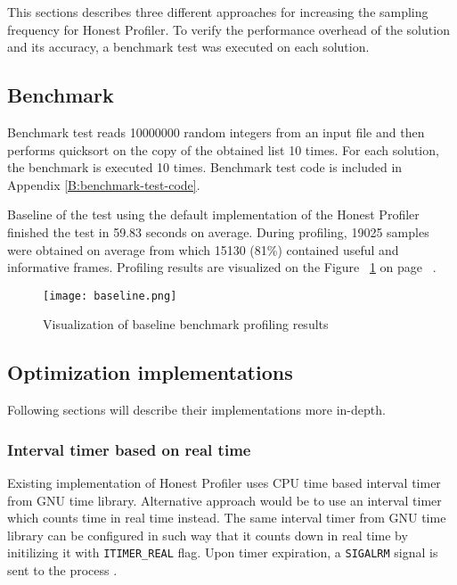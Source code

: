 \documentclass[..thesis.tex]{subfiles}
\begin{document}
This sections describes three different approaches for increasing the sampling frequency for Honest Profiler. To verify the performance overhead of the solution and its accuracy, a benchmark test was executed on each solution.

\subsection{Benchmark}
Benchmark test reads 10000000 random integers from an input file and then performs quicksort on the copy of the obtained list 10 times. For each solution, the benchmark is executed 10 times. Benchmark test code is included in Appendix \ref{B:benchmark-test-code}. 

Baseline of the test using the default implementation of the Honest Profiler finished the test in 59.83 seconds on average. During profiling, 19025 samples were obtained on average from which 15130 (81\%) contained useful and informative frames. Profiling results are visualized on the Figure ~\ref{fig:baseline} on page ~\pageref{fig:baseline}. 

\begin{figure}[h]
\texttt{[image: baseline.png]}
\caption{Visualization of baseline benchmark profiling results}
\label{fig:baseline}
\end{figure}

\subsection{Optimization implementations}
Following sections will describe their implementations more in-depth.

\subsubsection{Interval timer based on real time}
Existing implementation of Honest Profiler uses CPU time based interval timer from GNU time library. Alternative approach would be to use an interval timer which counts time in real time instead. The same interval timer from GNU time library can be configured in such way that it counts down in real time by initilizing it with \texttt{ITIMER\_REAL} flag. Upon timer expiration, a \texttt{SIGALRM} signal is sent to the process \cite{getitimer2}.
\end{document}
